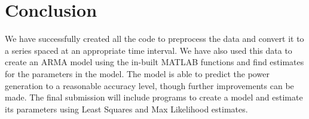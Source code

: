 \documentclass[journal]{IEEEtran}
\begin{document}
%






\section{Conclusion}
We have successfully created all the code to preprocess the data and convert it to a series spaced at an appropriate time interval. We have also used this data to create an ARMA model using the in-built MATLAB functions and find estimates for the parameters in the model. The model is able to predict the power generation to a reasonable accuracy level, though further improvements can be made. The final submission will include programs to create a model and estimate its parameters using Least Squares and Max Likelihood estimates.
\end{document}
